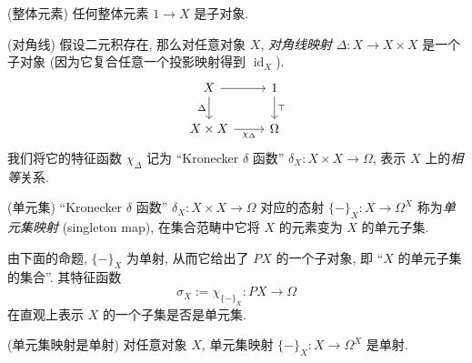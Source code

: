 \begin{example}
	{(整体元素)}
	任何整体元素 $1\to X$ 是子对象.
\end{example}

\begin{example}
    [label={diagonal}]
    {(对角线)}
    假设二元积存在, 那么对任意对象 $X$, \emph{对角线映射} $\Delta \colon X \to X\times X$ 是一个子对象 (因为它复合任意一个投影映射得到 $\operatorname{id}_X$).
\[\begin{tikzcd}[ampersand replacement=\&]
	X \& 1 \\
	{X\times X} \& \Omega
	\arrow["\Delta"', from=1-1, to=2-1]
	\arrow[from=1-1, to=1-2]
	\arrow["\top", from=1-2, to=2-2]
	\arrow["{\chi_\Delta}"', from=2-1, to=2-2]
\end{tikzcd}\]
    我们将它的特征函数 $\chi_{\Delta}$ 记为 ``Kronecker $\delta$ 函数'' $\delta_X \colon X \times X \to \Omega$, 表示 $X$ 上的\emph{相等}关系.
\end{example}

\begin{example}
	[label={singleton}]
	{(单元集)}
	``Kronecker $\delta$ 函数'' $\delta_X \colon X\times X\to \Omega$ 对应的态射 $\{-\}_X\colon X \to \Omega^X$ 称为\emph{单元集映射} (singleton map), 在集合范畴中它将 $X$ 的元素变为 $X$ 的单元子集.
	
	由下面的命题, $\{-\}_X$ 为单射, 从而它给出了 $PX$ 的一个子对象, 即 ``$X$ 的单元子集的集合''. 其特征函数
	$$
	\sigma_X := \chi_{\{-\}_X}\colon PX \to \Omega
	$$
	在直观上表示 $X$ 的一个子集是否是单元集.
\end{example}

\begin{prop}
	{(单元集映射是单射)}
	对任意对象 $X$, 单元集映射 $\{-\}_X\colon X \to \Omega^X$ 是单射.
\end{prop}

